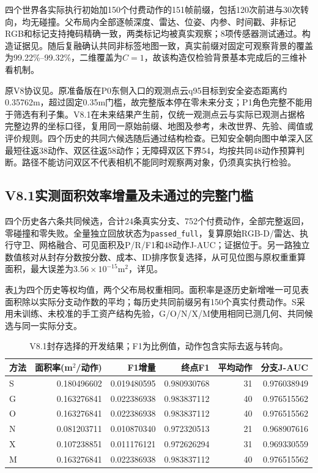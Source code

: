 \documentclass[11pt,a4paper]{article}
\begin{document}
四个世界各实际执行初始加150个付费动作的151帧前缀，包括120次前进与30次转向，均无碰撞。父布局内全部逐帧深度、雷达、位姿、内参、时间戳、非标记RGB和标记支持掩码精确一致，两类标记均被真实观察；8项传感器测试通过。构造证据见。随后复融确认共同非标签地图一致，真实前缀对固定可观察背景的覆盖为99.22\%--99.32\%，二维覆盖为$C=1$，故该构造仅检验背景基本完成后的三维补看机制。

原V8协议见。原准备版在P0东侧入口的观测点云q95目标到安全姿态距离约0.35762m，超过固定0.35m门槛，故完整版本停在零未来分支；P1角色完整不能用于筛选有利子集。V8.1在未来结果产生前，仅统一观测点云与实际已观测占据格完整边界的坐标口径，复用同一原始前缀、地图及参考，未改世界、先验、阈值或评价规则。四个历史的共同六候选随后通过结构检查。已知安全朝向图中单深入区最短往返38动作、双区往返58动作；无障碍双区下界54，均按共同48动作预算判断。路径不能访问双区不代表相机不能同时观察两对象，仍须真实执行检验。

\subsection{V8.1实测面积效率增量及未通过的完整门槛}
四个历史各六条共同候选，合计24条真实分支、752个付费动作，全部完整返回，零碰撞和零失败。全量独立回放状态为\texttt{passed\_full}，复算原始RGB-D/雷达、执行守卫、网格融合、可见面积及P/R/F1和48动作J-AUC；证据位于。另一路独立数值核对从封存分数按分数、成本、ID排序恢复选择，从可见位图与原权重重算面积，最大误差为$3.56\times10^{-15}$m$^2$，详见。

表\ref{tab:v81}为四个历史等权均值，两个父布局权重相同。面积率是逐历史新增唯一可见表面积除以实际分支动作数的平均；每历史共同前缀另有150个真实付费动作。S采用未训练、未校准的手工资产结构先验，G/O/N/X/M使用相同已测几何、共同候选与同一实际分支。
\begin{table}[htbp]
\centering\small
\caption{V8.1封存选择的开发结果；F1为比例值，动作包含实际去返与转向。}
\label{tab:v81}
\begin{tabular}{lrrrrr}
\toprule
方法 & 面积率(m$^2$/动作) & F1增量 & 终点F1 & 平均动作 & 分支J-AUC\\
\midrule
S & 0.180496602 & 0.019480595 & 0.980930768 & 31 & 0.976038949\\
G & 0.163276841 & 0.022386938 & 0.983837112 & 40 & 0.976515562\\
O & 0.163276841 & 0.022386938 & 0.983837112 & 40 & 0.976515562\\
N & 0.081203711 & 0.010870340 & 0.972320513 & 21 & 0.968907616\\
X & 0.107238851 & 0.011176121 & 0.972626294 & 31 & 0.969330559\\
M & 0.163276841 & 0.022386938 & 0.983837112 & 40 & 0.976515562\\
\bottomrule
\end{tabular}
\end{table}
\end{document}
